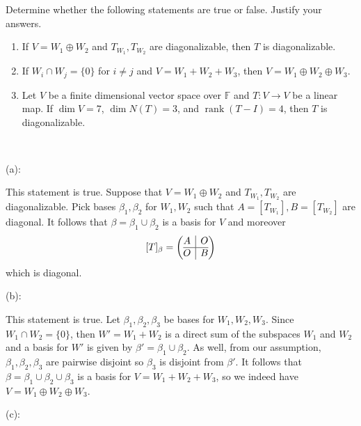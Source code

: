 \documentclass{eh-homework}
\begin{document}
    \begin{question}{11}
    Determine whether the following statements are true or false. Justify your answers.
    
    \begin{enumerate}[label=(\alph*)]
        \item If $V = W_1 \oplus W_2$ and $T_{W_1}, T_{W_2}$ are diagonalizable, then $T$ is diagonalizable.
        \item If $W_i \cap W_j = \{0\}$ for $i \neq j$ and $V = W_1 + W_2 + W_3$, then $V = W_1 \oplus W_2 \oplus W_3$.
        \item Let \(V\) be a finite dimensional vector space over \(\mathbb{F}\) and \(T: V \to V\) be a linear map. If $\dim V = 7$, $\dim N(T) = 3$, and $\operatorname{rank}(T - I) = 4$, then $T$ is diagonalizable.
    \end{enumerate}
    \tcblower
    \ 

    (a):

    This statement is true. Suppose that \(V = W_1 \oplus W_2\) and \(T_{W_1}, T_{W_2}\) are diagonalizable. Pick bases \(\beta _1, \beta _2\) for \(W_1, W_2\) such that \(A = [T_{W_1}], B = [T_{W_2}]\) are diagonal. It follows that \(\beta = \beta _1 \cup \beta _2\) is a basis for \(V\) and moreover
    \[
        [T]_\beta = \left( \begin{array}{@{}c|c@{}}
            A & O \\
            \hline
            O & B
        \end{array} \right)
    \]
    which is diagonal.

    \bigskip

    (b):

    This statement is true. Let \(\beta _1, \beta _2, \beta _3\) be bases for \(W_1, W_2, W_3\). Since \(W_1 \cap W_2 = \{ 0 \}\), then \(W' = W_1 + W_2\) is a direct sum of the subspaces \(W_1\) and \(W_2\) and a basis for \(W'\) is given by \(\beta ' = \beta _1 \cup \beta _2\). As well, from our assumption, \(\beta _1, \beta _2, \beta _3\) are pairwise disjoint so \(\beta_3\) is disjoint from \(\beta '\). It follows that \(\beta = \beta _1 \cup \beta _2 \cup \beta _3\) is a basis for \(V = W_1 + W_2 + W_3\), so we indeed have \(V = W_1 \oplus W_2 \oplus W_3\).

    \bigskip

    (c):


\end{question}
\end{document}
